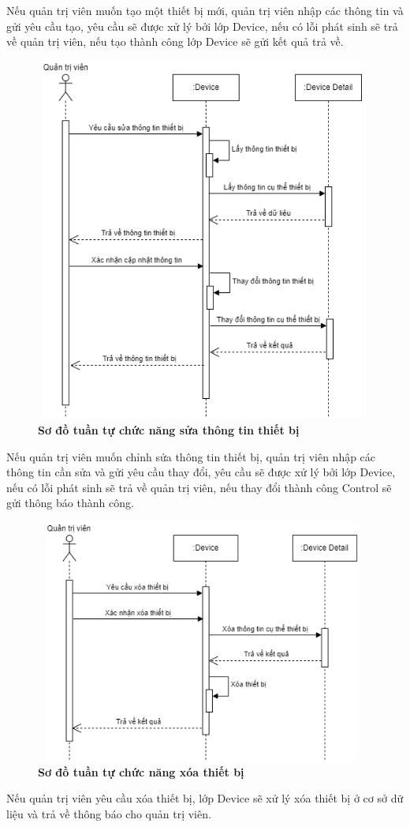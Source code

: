 Nếu quản trị viên muốn tạo một thiết bị mới, quản trị viên nhập các thông tin và gửi yêu cầu tạo, yêu cầu sẽ được xử lý bởi lớp Device, nếu có lỗi phát sinh sẽ trả về quản trị viên, 
nếu tạo thành công lớp Device sẽ gửi kết quả trả về. 
\begin{figure}[H]
  \centering
  \includegraphics[width=11cm,height=12cm]{Images/sequence/sequence_manage_edit_device.png}
  \caption[Sơ đồ tuần tự chức năng sửa thông tin thiết bị]{\bfseries \fontsize{12pt}{0pt}
  \selectfont Sơ đồ tuần tự chức năng sửa thông tin thiết bị}
  \label{sequence_manage_edit_device} %
\end{figure}
Nếu quản trị viên muốn chỉnh sửa thông tin thiết bị, quản trị viên nhập các thông tin cần sửa và gửi yêu cầu thay đổi, yêu cầu sẽ được xử lý
bởi lớp Device, nếu có lỗi phát sinh sẽ trả về quản trị viên, nếu thay đổi thành công Control sẽ gửi thông báo thành công. 
\begin{figure}[H]
  \centering
  \includegraphics[width=11cm,height=8cm]{Images/sequence/sequence_manage_delete_device.png}
  \caption[Sơ đồ tuần tự chức năng xóa thiết bị]{\bfseries \fontsize{12pt}{0pt}
  \selectfont Sơ đồ tuần tự chức năng xóa thiết bị}
  \label{sequence_manage_delete_device} %
\end{figure}
Nếu quản trị viên yêu cầu xóa thiết bị, lớp Device sẽ xử lý xóa thiết bị ở cơ sở dữ liệu và trả về thông báo cho quản trị viên.


